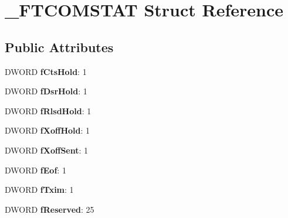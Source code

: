\hypertarget{struct___f_t_c_o_m_s_t_a_t}{}\section{\+\_\+\+F\+T\+C\+O\+M\+S\+T\+AT Struct Reference}
\label{struct___f_t_c_o_m_s_t_a_t}
\subsection*{Public Attributes}
\begin{DoxyCompactItemize}
\item 
D\+W\+O\+RD {\bfseries f\+Cts\+Hold}\+: 1\hypertarget{struct___f_t_c_o_m_s_t_a_t_ad78060ad831dfa35a9e2db1103a54c3f}{}\label{struct___f_t_c_o_m_s_t_a_t_ad78060ad831dfa35a9e2db1103a54c3f}

\item 
D\+W\+O\+RD {\bfseries f\+Dsr\+Hold}\+: 1\hypertarget{struct___f_t_c_o_m_s_t_a_t_a63c6ff1a00dd690b0bf9347c949a59c8}{}\label{struct___f_t_c_o_m_s_t_a_t_a63c6ff1a00dd690b0bf9347c949a59c8}

\item 
D\+W\+O\+RD {\bfseries f\+Rlsd\+Hold}\+: 1\hypertarget{struct___f_t_c_o_m_s_t_a_t_afb2b9a88896f528efbe6c9ff73b7744c}{}\label{struct___f_t_c_o_m_s_t_a_t_afb2b9a88896f528efbe6c9ff73b7744c}

\item 
D\+W\+O\+RD {\bfseries f\+Xoff\+Hold}\+: 1\hypertarget{struct___f_t_c_o_m_s_t_a_t_a5b2fd786cc95e60df49aa55f7d4d7d5a}{}\label{struct___f_t_c_o_m_s_t_a_t_a5b2fd786cc95e60df49aa55f7d4d7d5a}

\item 
D\+W\+O\+RD {\bfseries f\+Xoff\+Sent}\+: 1\hypertarget{struct___f_t_c_o_m_s_t_a_t_a5a28cf3c2aea49110593931c78934416}{}\label{struct___f_t_c_o_m_s_t_a_t_a5a28cf3c2aea49110593931c78934416}

\item 
D\+W\+O\+RD {\bfseries f\+Eof}\+: 1\hypertarget{struct___f_t_c_o_m_s_t_a_t_a2a4cdfc245e72f74b032f7a5cc220fd3}{}\label{struct___f_t_c_o_m_s_t_a_t_a2a4cdfc245e72f74b032f7a5cc220fd3}

\item 
D\+W\+O\+RD {\bfseries f\+Txim}\+: 1\hypertarget{struct___f_t_c_o_m_s_t_a_t_a04853d07abaf4fb47891a3bbdd78be8d}{}\label{struct___f_t_c_o_m_s_t_a_t_a04853d07abaf4fb47891a3bbdd78be8d}

\item 
D\+W\+O\+RD {\bfseries f\+Reserved}\+: 25\hypertarget{struct___f_t_c_o_m_s_t_a_t_a567f611e7f3dc193ff94ac4c44fbc500}{}\label{struct___f_t_c_o_m_s_t_a_t_a567f611e7f3dc193ff94ac4c44fbc500}


\end{DoxyCompactItemize}
